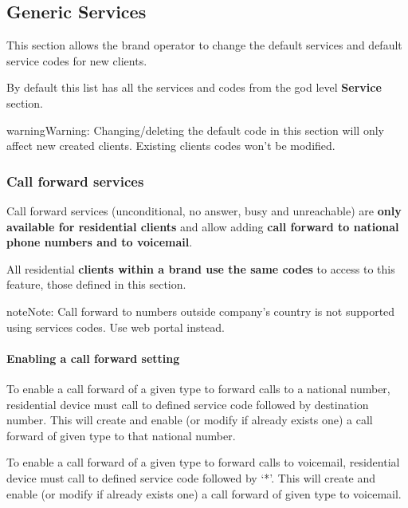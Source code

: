 \documentclass[letterpaper,10pt,english]{sphinxmanual}
\begin{document}
\subsection{Generic Services}
\label{administration_portal/brand/settings/generic_services:generic-services}\label{administration_portal/brand/settings/generic_services::doc}\label{administration_portal/brand/settings/generic_services:brand-services}
This section allows the brand operator to change the default services and default service codes for new clients.

By default this list has all the services and codes from the god level \textbf{Service} section.

\begin{notice}{warning}{Warning:}
Changing/deleting the default code in this section will only affect new created clients. Existing clients codes won't
be modified.
\end{notice}


\subsubsection{Call forward services}
\label{administration_portal/brand/settings/generic_services:call-forward-services}\label{administration_portal/brand/settings/generic_services:id1}
Call forward services (unconditional, no answer, busy and unreachable) are \textbf{only available for residential clients}
and allow adding \textbf{call forward to national phone numbers and to voicemail}.

All residential \textbf{clients within a brand use the same codes} to access to this feature, those defined in this section.

\begin{notice}{note}{Note:}
Call forward to numbers outside company's country is not supported using services codes.
Use web portal instead.
\end{notice}
\paragraph{Enabling a call forward setting}

To enable a call forward of a given type to forward calls to a national number, residential device must call to defined
service code followed by destination number. This will create and enable (or modify if already exists one) a call
forward of given type to that national number.

To enable a call forward of a given type to forward calls to voicemail, residential device must call to defined
service code followed by `*'. This will create and enable (or modify if already exists one) a call
forward of given type to voicemail.
\end{document}
